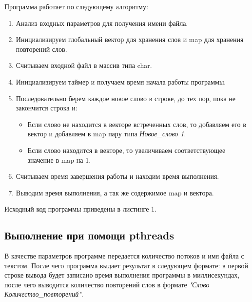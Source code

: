 \documentclass[12pt,a4paper]{report}
\begin{document}
			Программа работает по следующему алгоритму:
			\begin{enumerate}
				\item Анализ входных параметров для получения имени файла.
				\item Инициализируем глобальный вектор для хранения слов и map для 
				хранения повторений слов.
				\item Считываем входной файл в массив типа char.
				\item Инициализируем таймер и получаем время начала работы программы.
				\item Последовательно берем каждое новое слово в строке, до тех пор, 
				пока не закончится строка и:
					\begin{itemize}
						\item Если слово не находится в векторе встреченных слов, то 
						добавляем его в вектор и добавляем в map пару типа 
						\textit{Новое\_слово 1}.
						\item Если слово находится в векторе, то увеличиваем 
						соответствующее значение в map на 1.
					\end{itemize}
				\item Считываем время завершения работы и находим время выполнения.
				\item Выводим время выполнения, а так же содержимое map и вектора.
			\end{enumerate}
				
			Исходный код программы приведены в листинге 1.
				
		\subsection{Выполнение при помощи pthreads}
				В качестве параметров программе передается количество потоков и имя 
				файла с текстом. После чего программа выдает результат в следующем 
				формате: в первой строке вывода будет записано время выполнения 
				программы в миллисекундах, после чего выводится количество повторений 
				слов в формате \textit{"Слово Количество\_повторений"}.
					
\end{document}
